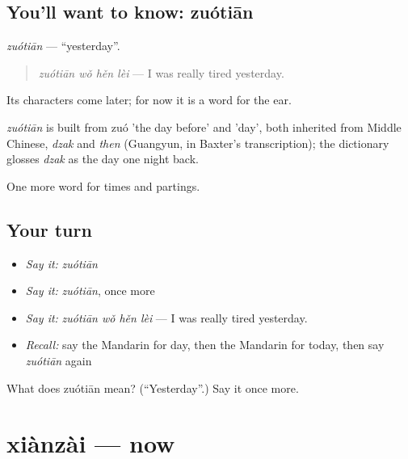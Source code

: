 \subsection*{You'll want to know: zuótiān}
\emph{zuótiān} — \textquotedblleft{}yesterday\textquotedblright{}.

\begin{quote}
\emph{zuótiān wǒ hěn lèi} — I was really tired yesterday.
\end{quote}

Its characters come later; for now it is a word for the ear.

\begin{cousinweb}
\emph{zuótiān} is built from zuó 'the day before' and  'day', both inherited from Middle Chinese, \emph{dzak} and \emph{then} (Guangyun, in Baxter's transcription); the dictionary glosses \emph{dzak} as the day one night back.
\end{cousinweb}

\begin{grammarlens}[title={What you've built}]
One more word for times and partings.
\end{grammarlens}

\subsection*{Your turn}
\begin{itemize}
\raggedright
  \item \emph{Say it:} \emph{zuótiān}
  \item \emph{Say it:} \emph{zuótiān}, once more
  \item \emph{Say it:} \emph{zuótiān wǒ hěn lèi} — I was really tired yesterday.
  \item \emph{Recall:} say the Mandarin for day, then the Mandarin for today, then say \emph{zuótiān} again
\end{itemize}

\begin{tcolorbox}[breakable,colback=teal!4,colframe=teal!35!black,title={Before you move on}]
What does zuótiān mean? (\textquotedblleft{}Yesterday\textquotedblright{}.) Say it once more.
\end{tcolorbox}
\section[xiànzài]{xiànzài — now}

\label{lesson:ZH-C45-xianzai}



